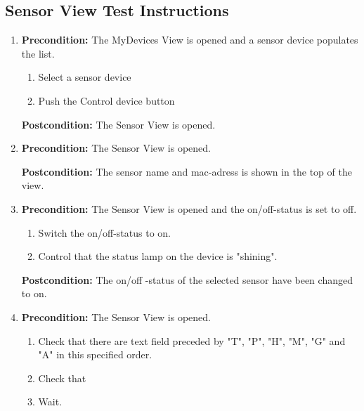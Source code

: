 \documentclass[a4paper]{article}
\newlength{\testlabellength}
\newenvironment{testlist}{\begin{enumerate}[label=\bfseries Instruction \thesubsection.\arabic* , labelindent=0pt, labelwidth=\testlabellength , leftmargin=2cm]}{\end{enumerate}}
\begin{document}
\begin{appendices}
\subsection{Sensor View Test Instructions}
\begin{testlist}
 \item \vspace{5mm} \textbf{Precondition:} The MyDevices View is opened and a sensor device populates the list.
    			\begin{enumerate}
    				\item Select a sensor device
    				\item Push the Control device button
    			\end{enumerate}
    			\textbf{Postcondition:} The Sensor View is opened. 


 \item \vspace{5mm} \textbf{Precondition:} The Sensor View is opened.
    		
    			
    			
    			\textbf{Postcondition:} The sensor name and mac-adress is shown in the top of the view.
 
  \item \vspace{5mm} \textbf{Precondition:} The Sensor View is opened and the on/off-status is set to off.
    			\begin{enumerate}
    				\item Switch the on/off-status to on.  
	    		    \item Control that the status lamp on the device is "shining".
    			\end{enumerate}
    			\textbf{Postcondition:} The on/off -status of the selected sensor have been changed to on.

 \item \vspace{5mm} \textbf{Precondition:} The Sensor View is opened. 
    			\begin{enumerate}
    				\item Check that there are text field preceded by "T", "P", "H", "M", "G" and "A" in this specified order. 
    				\item Check that 
	    			\item Wait.
    			

\end{enumerate}
\end{testlist}
\end{appendices}
\end{document}
